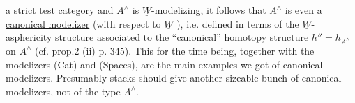 
a strict test category and $A^\wedge$ is $\underline{W}$-modelizing,  it follows that $A^\wedge$ is
even a \uline{canonical modelizer} (with respect to $\underline{W}$ ),  i.e.  defined in
terms of the $\underline{W}$-asphericity structure associated to the ``canonical''
homotopy structure $h'' = h_{A^\wedge}$ on $A^\wedge$ (cf. prop.2  (ii)  p. 345).  This
for the time being,  together with the modelizers (Cat) and (Spaces),
are the main examples we got of canonical modelizers.  Presumably
stacks should give another sizeable bunch of canonical modelizers,
not of the type $A^\wedge$.

\begin{center}\shortstack{*\qquad *\\{}*}\end{center}

